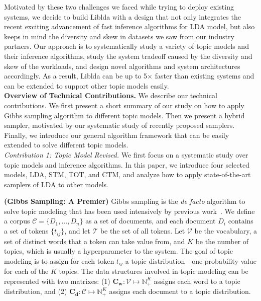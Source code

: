 \documentclass[10pt,journal,cspaper,compsoc]{IEEEtran}
\begin{document}
Motivated by these two challenges we faced
while trying to deploy existing systems,
we decide to build Liblda with a design that
not only integrates the recent exciting
advancement of fast inference algorithms for LDA model, but also keeps in mind the diversity and skew in datasets we saw from our industry partners.
Our approach is to systematically study a variety of
topic models and their inference algorithms, study the system tradeoff caused by the diversity and skew of the workloads, and design novel algorithms and system architectures accordingly.
As a result, Liblda can be up to 5$\times$
faster than existing systems and can be extended to
support other topic models easily.
\\

\noindent
{\bf Overview of Technical Contributions.}
We describe our technical contributions.
We first present a short summary of our study on how to apply Gibbs sampling algorithm to different topic models. 
Then we present a hybrid sampler, motivated by our systematic study of recently proposed samplers.
Finally, we introduce our {{{general algorithm framework}}}
that can be easily extended to solve different
topic models.
\\

\noindent
{\large \em Contribution 1: Topic Model Revised.}
We first focus on a systematic study over topic models
and inference algorithms. In this paper, we introduce 
four selected models, LDA, STM, TOT, and CTM, and
analyze how to apply state-of-the-art samplers of LDA to other models.

\vspace{0.5em}
{\bf (Gibbs Sampling: A Premier)}
Gibbs sampling is the {\em de facto} algorithm to solve topic modeling that has been used intensively
by previous work~\cite{harvey2013building,zhu2012medlda, yao2009efficient,li2014reducing,yu2015scalable,yuan2015lightlda, chen2016warplda,DBLP:journals/tbd/XingHDKWLZXKY15,smola2010architecture}.
We define a corpus $\mathcal{C}=\{D_1,...,D_n\}$
as a set of documents, and each document $D_i$ contains a set of tokens $\{t_{ij}\}$,
and let $\mathcal{T}$ be the set of all tokens.
Let $\mathcal{V}$ be the vocabulary, a set of distinct words that a token can take value from, and $K$ be the number of topics, which is usually a hyperparameter to the system.
The goal of topic modeling is to assign for each
token $t_{ij}$ a topic distribution---one probability
value for each of the $K$ topics.
The data structures involved in topic modeling can
be represented with two matrixes:
(1) $\mathbf{C_w }: \mathcal{V} \mapsto \mathbb{N}_+^{K}$
assigns each word to a topic distribution, and
(2) $\mathbf{C_d }: \mathcal{C} \mapsto \mathbb{N}_+^{K}$
assigns each document to a topic distribution.
\end{document}
